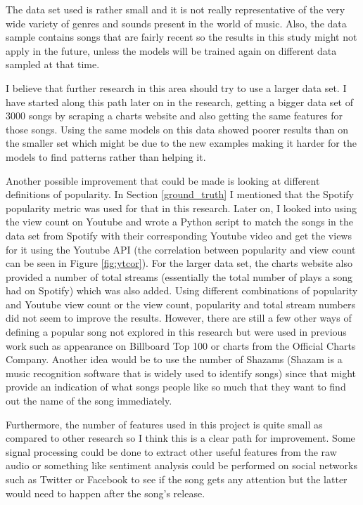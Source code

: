 The data set used is rather small and it is not really representative of the very wide variety of genres and sounds present in the world of music. Also, the data sample contains songs that are fairly recent so the results in this study might not apply in the future, unless the models will be trained again on different data sampled at that time. 

I believe that further research in this area should try to use a larger data set. I have started along this path later on in the research, getting a bigger data set of 3000 songs by scraping a charts website \cite{SpotifyCharts:online} and also getting the same features for those songs. Using the same models on this data showed poorer results than on the smaller set which might be due to the new examples making it harder for the models to find patterns rather than helping it.

Another possible improvement that could be made is looking at different definitions of popularity. In Section \ref{ground_truth} I mentioned that the Spotify popularity metric was used for that in this research. Later on, I looked into using the view count on Youtube and wrote a Python script to match the songs in the data set from Spotify with their corresponding Youtube video and get the views for it using the Youtube API (the correlation between popularity and view count can be seen in Figure \ref{fig:ytcor}). For the larger data set, the charts website \cite{SpotifyCharts:online} also provided a number of total streams (essentially the total number of plays a song had on Spotify) which was also added. Using different combinations of popularity and Youtube view count or the view count, popularity and total stream numbers did not seem to improve the results. However, there are still a few other ways of defining a popular song not explored in this research but were used in previous work such as appearance on Billboard Top 100 or charts from the Official Charts Company. Another idea would be to use the number of Shazams \cite{wang2006shazam} (Shazam is a music recognition software that is widely used to identify songs) since that might provide an indication of what songs people like so much that they want to find out the name of the song immediately. 

Furthermore, the number of features used in this project is quite small as compared to other research so I think this is a clear path for improvement. Some signal processing could be done to extract other useful features from the raw audio or something like sentiment analysis could be performed on social networks such as Twitter or Facebook to see if the song gets any attention but the latter would need to happen after the song's release.

